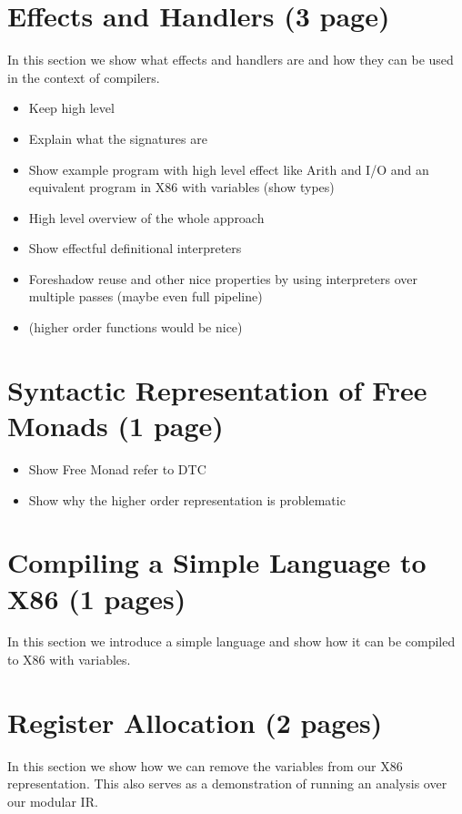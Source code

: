 \documentclass[sigplan,anonymous,review]{acmart}
\begin{document}
\section{Effects and Handlers (3 page)} \label{sec:effects-handlers}

In this section we show what effects and handlers are and how they can be used in the context of compilers.

\begin{itemize}
  \item Keep high level
  \item Explain what the signatures are
  \item Show example program with high level effect like Arith and I/O and an equivalent program in X86 with variables (show types)
  \item High level overview of the whole approach
  \item Show effectful definitional interpreters
  \item Foreshadow reuse and other nice properties by using interpreters over multiple passes (maybe even full pipeline)
  \item (higher order functions would be nice)
\end{itemize}

\section{Syntactic Representation of Free Monads (1 page)}
  
\begin{itemize}
\item Show Free Monad refer to DTC
\item Show why the higher order representation is problematic
\end{itemize}

\section{Compiling a Simple Language to X86 (1 pages)} \label{sec:simple-lang}

In this section we introduce a simple language and show how it can be compiled to X86 with variables.

\section{Register Allocation (2 pages)} \label{sec:analysis}

In this section we show how we can remove the variables from our X86 representation.
This also serves as a demonstration of running an analysis over our modular IR.
\end{document}
